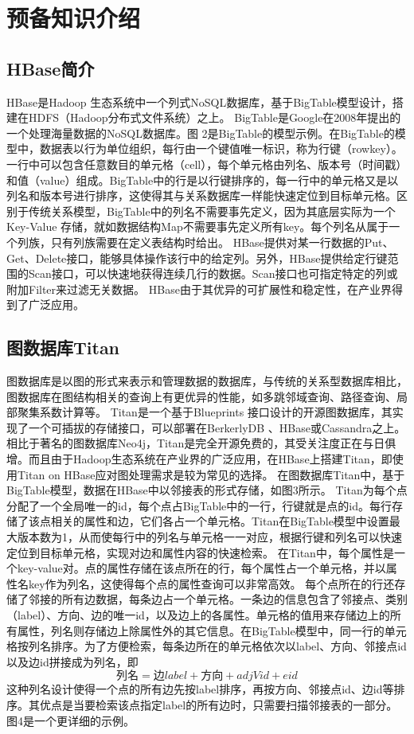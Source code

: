 
\chapter{预备知识介绍}
\section{HBase简介}
HBase是Hadoop 生态系统中一个列式NoSQL数据库，基于BigTable\supercite{bigtable}模型设计，搭建在HDFS（Hadoop分布式文件系统）之上。
BigTable是Google在2008年提出的一个处理海量数据的NoSQL数据库。图 2是BigTable的模型示例。在BigTable的模型中，数据表以行为单位组织，每行由一个键值唯一标识，称为行键（rowkey）。一行中可以包含任意数目的单元格（cell），每个单元格由列名、版本号（时间戳）和值（value）组成。BigTable中的行是以行键排序的，每一行中的单元格又是以列名和版本号进行排序，这使得其与关系数据库一样能快速定位到目标单元格。区别于传统关系模型，BigTable中的列名不需要事先定义，因为其底层实际为一个Key-Value 存储，就如数据结构Map不需要事先定义所有key。每个列名从属于一个列族，只有列族需要在定义表结构时给出。
HBase提供对某一行数据的Put、Get、Delete接口，能够具体操作该行中的给定列。另外，HBase提供给定行键范围的Scan接口，可以快速地获得连续几行的数据。Scan接口也可指定特定的列或附加Filter来过滤无关数据。
HBase由于其优异的可扩展性和稳定性，在产业界得到了广泛应用。

\section{图数据库Titan}
图数据库是以图的形式来表示和管理数据的数据库\supercite{graph_models_survey}，与传统的关系型数据库相比，图数据库在图结构相关的查询上有更优异的性能，如多跳邻域查询、路径查询、局部聚集系数计算等。
Titan是一个基于Blueprints 接口设计的开源图数据库，其实现了一个可插拔的存储接口，可以部署在BerkerlyDB 、HBase或Cassandra\supercite{cassandra}之上。相比于著名的图数据库Neo4j\supercite{neo4j}，Titan是完全开源免费的，其受关注度正在与日俱增。而且由于Hadoop生态系统在产业界的广泛应用，在HBase上搭建Titan，即使用Titan on HBase应对图处理需求是较为常见的选择。
在图数据库Titan中，基于BigTable模型，数据在HBase中以邻接表的形式存储，如图3所示。
Titan为每个点分配了一个全局唯一的id，每个点占BigTable中的一行，行键就是点的id。每行存储了该点相关的属性和边，它们各占一个单元格。Titan在BigTable模型中设置最大版本数为1，从而使每行中的列名与单元格一一对应，根据行键和列名可以快速定位到目标单元格，实现对边和属性内容的快速检索。
在Titan中，每个属性是一个key-value对。点的属性存储在该点所在的行，每个属性占一个单元格，并以属性名key作为列名，这使得每个点的属性查询可以非常高效。
每个点所在的行还存储了邻接的所有边数据，每条边占一个单元格。一条边的信息包含了邻接点、类别（label）、方向、边的唯一id，以及边上的各属性。单元格的值用来存储边上的所有属性，列名则存储边上除属性外的其它信息。在BigTable模型中，同一行的单元格按列名排序。为了方便检索，每条边所在的单元格依次以label、方向、邻接点id以及边id拼接成为列名，即
$$列名 = 边label + 方向+ adjVid + eid$$
这种列名设计使得一个点的所有边先按label排序，再按方向、邻接点id、边id等排序。其优点是当要检索该点指定label的所有边时，只需要扫描邻接表的一部分。图4是一个更详细的示例。

